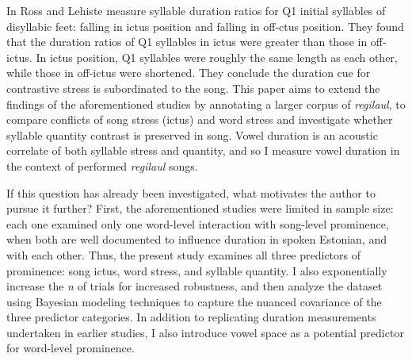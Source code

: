 In \citep{rossTimingEstonianFolk1998} Ross and Lehiste measure syllable duration ratios for Q1 initial syllables of disyllabic feet: falling in ictus position and falling in off-ctus position. They found that the duration ratios of Q1 syllables in ictus were greater than those in off-ictus. In ictus position, Q1 syllables were roughly the same length as each other, while those in off-ictus were shortened. They conclude the duration cue for contrastive stress is subordinated to the song. 
This paper aims to extend the findings of the aforementioned studies \citep{lehistePhoneticsMetrics1992, rossLostProsodicOppositions1994,rossTradeoffQuantityStress1996,rossTimingEstonianFolk1998} by annotating a larger corpus of {\it regilaul}, to compare conflicts of song stress (ictus) and word stress 
and investigate whether syllable quantity contrast is preserved in song. Vowel duration is an acoustic correlate of both syllable stress and quantity, and so I measure vowel duration in the context of performed {\it regilaul} songs. 
%

If this question has already been investigated, what motivates the author to pursue it further? First, the aforementioned studies were limited in sample size: each one examined only one word-level interaction with song-level prominence, when both are well documented to influence duration in spoken Estonian, and with each other. Thus, the present study examines all three predictors of prominence: song ictus, word stress, and syllable quantity. I also exponentially increase the {\it n} of trials for increased robustness, and then analyze the dataset using Bayesian modeling techniques to capture the nuanced covariance of the three predictor categories. In addition to replicating duration measurements undertaken in earlier studies, I also introduce vowel space as a potential predictor for word-level prominence. 





